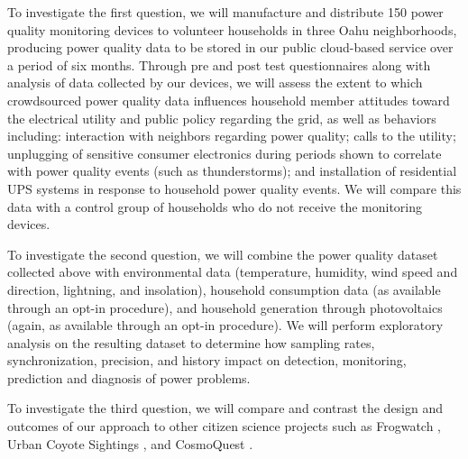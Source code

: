 \documentclass[11pt]{article}
\begin{document}
To investigate the first question, we will manufacture and distribute 150 power quality monitoring devices to volunteer households in three Oahu neighborhoods, producing power quality data to be stored in our public cloud-based service over a period of six months. Through pre and post test questionnaires along with analysis of data collected by our devices, we will assess the extent to which crowdsourced power quality data influences household member attitudes toward the electrical utility and public policy regarding the grid, as well as behaviors including: interaction with neighbors regarding power quality; calls to the utility; unplugging of sensitive consumer electronics during periods shown to correlate with power quality events (such as thunderstorms); and installation of residential UPS systems in response to household power quality events.  We will compare this data with a control group of households who do not receive the monitoring devices. 

To investigate the second question, we will combine the power quality dataset collected above with environmental data (temperature, humidity, wind speed and direction, lightning, and insolation), household consumption data (as available through an opt-in procedure), and household generation through photovoltaics (again, as available through an opt-in procedure).  We will perform exploratory analysis on the resulting dataset to determine how sampling rates, synchronization, precision, and history impact on detection, monitoring, prediction and diagnosis of power problems.

To investigate the third question, we will compare and contrast the design and outcomes of our approach to other citizen science projects such as Frogwatch \cite{frogwatch}, Urban Coyote Sightings \cite{urbancoyote}, and CosmoQuest \cite{cosmoquest}.

\end{document}
